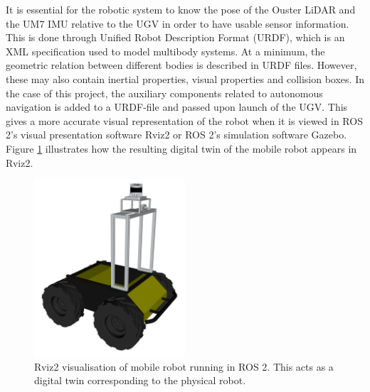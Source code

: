 It is essential for the robotic system to know the pose of the Ouster LiDAR and the UM7 IMU relative to the UGV in order to have usable sensor information. This is done through Unified Robot Description Format (URDF), which is an XML specification used to model multibody systems. At a minimum, the geometric relation between different bodies is described in URDF files. However, these may also contain inertial properties, visual properties and collision boxes. In the case of this project, the auxiliary components related to autonomous navigation is added to a URDF-file and passed upon launch of the UGV. This gives a more accurate visual representation of the robot when it is viewed in ROS 2's visual presentation software Rviz2 or ROS 2's simulation software Gazebo. Figure \ref{fig:M:AN:MC:digitalTwin} illustrates how the resulting digital twin of the mobile robot appears in Rviz2.

\begin{figure}[htp]
  \centering
  \includegraphics[width = 0.5\textwidth]{Figures/figHuskyRviz.pdf}
  \caption{Rviz2 visualisation of mobile robot running in ROS 2. This acts as a digital twin corresponding to the physical robot.}
  \label{fig:M:AN:MC:digitalTwin}
\end{figure}




